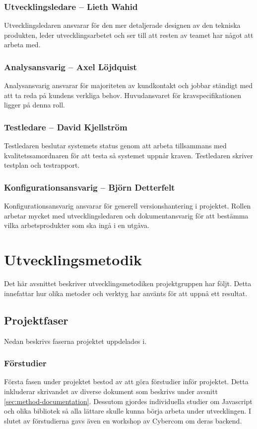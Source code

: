 \subsubsection*{Utvecklingsledare -- Lieth Wahid}
Utvecklingsledaren ansvarar för den mer detaljerade designen av den tekniska produkten, leder utvecklingsarbetet och ser till att resten av teamet har något att arbeta med.

\subsubsection*{Analysansvarig -- Axel Löjdquist}
Analysansvarig ansvarar för majoriteten av kundkontakt och jobbar ständigt med att ta reda på kundens verkliga behov. Huvudansvaret för kravspecifikationen ligger på denna roll.

\subsubsection*{Testledare -- David Kjellström}
Testledaren beslutar systemets status genom att arbeta tillsammans med kvalitetssamordnaren för att testa så systemet uppnår kraven. Testledaren skriver testplan och testrapport.

\subsubsection*{Konfigurationsansvarig -- Björn Detterfelt}
Konfigurationsansvarig ansvarar för generell versionshantering i projektet. Rollen arbetar mycket med utvecklingsledaren och dokumentansvarig för att bestämma vilka arbetsprodukter som ska ingå i en utgåva.

\section{Utvecklingsmetodik}
Det här avsnittet beskriver utvecklingsmetodiken projektgruppen har följt. Detta innefattar hur olika metoder och verktyg har använts för att uppnå ett resultat.

\subsection{Projektfaser}
Nedan beskrivs faserna projektet uppdelades i.

\subsubsection*{Förstudier}
Första fasen under projektet bestod av att göra förstudier inför projektet. Detta inkluderar skrivandet av diverse dokument som beskrivs under avsnitt \ref{sec:method-documentation}. Dessutom gjordes individuella studier om Javascript och olika bibliotek så alla lättare skulle kunna börja arbeta under utvecklingen. I slutet av förstudierna gavs även en workshop av Cybercom om deras backend.


